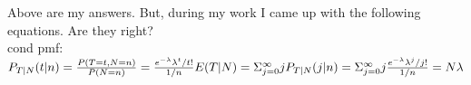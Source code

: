 \documentclass{article}
\begin{document}
\begin{enumerate}
	Above are my answers. But, during my work I came up with the following equations. Are they right? \\
	cond pmf: $P_{T|N}(t|n) = \frac{P(T=t, N=n)}{P(N=n)} = \frac{e^{- \lambda} \lambda^t / t!}{1/n} \\
	E(T|N) = \Sigma_{j = 0}^\infty j P_{T|N}(j|n) = \Sigma_{j = 0}^\infty j \frac{e^{- \lambda} \lambda^j / j!}{1/n} = N \lambda$
\end{enumerate}
\end{document}
